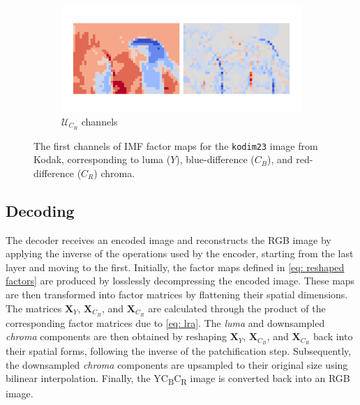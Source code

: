 \begin{figure}[t]
\begin{minipage}{0.35\textwidth}
\begin{minipage}{\textwidth}
        \end{minipage}
        \begin{minipage}{\textwidth}
            \begin{subfigure}{\textwidth}
                \centering
                \includegraphics[width=.95\textwidth]{figures/kodim23_cr_components.pdf}
                \vspace{-12pt}
                \caption{$\bm{\mathcal{U}}_{C_R}$ channels}
            \end{subfigure}%
        \end{minipage}
    \end{minipage}
    \caption{The first channels of IMF factor maps for the \texttt{kodim23} image from Kodak, corresponding to luma ($Y$), blue-difference ($C_B$), and red-difference ($C_R$) chroma.}
	\label{fig: imf_components}
\end{figure}


\subsection{Decoding} \label{sec: decoding}

The decoder receives an encoded image and reconstructs the RGB image by applying the inverse of the operations used by the encoder, starting from the last layer and moving to the first. Initially, the factor maps defined in \eqref{eq: reshaped factors} are produced by losslessly decompressing the encoded image. These maps are then transformed into factor matrices by flattening their spatial dimensions. The matrices $\bm{X}_{Y}$, $\bm{X}_{C_B}$, and $\bm{X}_{C_R}$ are calculated through the product of the corresponding factor matrices due to \eqref{eq: lra}. The \emph{luma} and downsampled \emph{chroma} components are then obtained by reshaping $\bm{X}_{Y}$, $\bm{X}_{C_B}$, and $\bm{X}_{C_R}$ back into their spatial forms, following the inverse of the patchification step. Subsequently, the downsampled \emph{chroma} components are upsampled to their original size using bilinear interpolation. Finally, the YC\textsubscript{B}C\textsubscript{R} image is converted back into an RGB image. 

